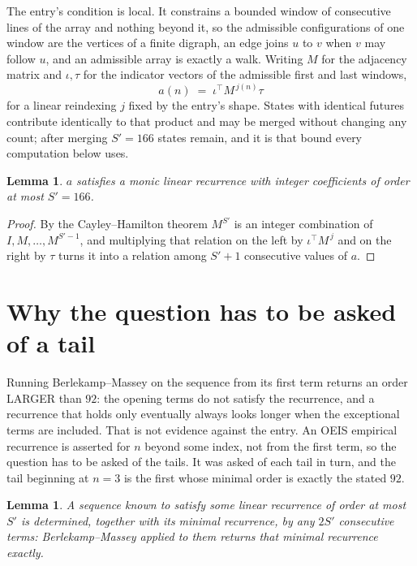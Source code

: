 \documentclass[11pt,a4paper]{article}
\theoremstyle{plain}
\newtheorem{lemma}[theorem]{Lemma}
\theoremstyle{definition}
\begin{document}
The entry's condition is local. It constrains a bounded window of consecutive lines of the
array and nothing beyond it, so the admissible configurations of one window are the vertices of
a finite digraph, an edge joins $u$ to $v$ when $v$ may follow $u$, and an admissible array is
exactly a walk. Writing $M$ for the adjacency matrix and $\iota,\tau$ for the indicator vectors
of the admissible first and last windows,
\[
a(n)\;=\;\iota^{\!\top}M^{\,j(n)}\tau
\]
for a linear reindexing $j$ fixed by the entry's shape. States with identical futures
contribute identically to that product and may be merged without changing any count; after
merging $S'=166$ states remain, and it is that bound every computation below uses.

\begin{lemma}\label{lem:cf}
$a$ satisfies a monic linear recurrence with integer coefficients of order at most $S'=166$.
\end{lemma}

\begin{proof}
By the Cayley--Hamilton theorem $M^{S'}$ is an integer combination of $I,M,\dots,M^{S'-1}$,
and multiplying that relation on the left by $\iota^{\!\top}M^{\,j}$ and on the right by
$\tau$ turns it into a relation among $S'+1$ consecutive values of $a$.
\end{proof}

\section{Why the question has to be asked of a tail}

Running Berlekamp--Massey on the sequence from its first term returns an order LARGER than $92$: the opening terms do not satisfy the recurrence, and a recurrence that holds only eventually always looks longer when the exceptional terms are included. That is not evidence against the entry. An OEIS empirical recurrence is asserted for $n$ beyond some index, not from the first term, so the question has to be asked of the tails. It was asked of each tail in turn, and the tail beginning at $n=3$ is the first whose minimal order is exactly the stated $92$.

\begin{lemma}\label{lem:bm}
A sequence known to satisfy some linear recurrence of order at most $S'$ is determined,
together with its minimal recurrence, by any $2S'$ consecutive terms: Berlekamp--Massey applied
to them returns that minimal recurrence exactly.
\end{lemma}
\end{document}
